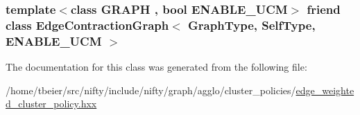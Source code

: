 \subsubsection[{Edge\+Contraction\+Graph$<$ Graph\+Type, Self\+Type, E\+N\+A\+B\+L\+E\+\_\+\+U\+C\+M $>$}]{\setlength{\rightskip}{0pt plus 5cm}template$<$class G\+R\+A\+P\+H , bool E\+N\+A\+B\+L\+E\+\_\+\+U\+C\+M$>$ friend class {\bf Edge\+Contraction\+Graph}$<$ {\bf Graph\+Type}, {\bf Self\+Type}, E\+N\+A\+B\+L\+E\+\_\+\+U\+C\+M $>$\hspace{0.3cm}{\ttfamily [friend]}}\label{classnifty_1_1graph_1_1agglo_1_1EdgeWeightedClusterPolicy_a6939aa4c6113ba9c44fd5e048687ba92}


The documentation for this class was generated from the following file\+:\begin{DoxyCompactItemize}
\item 
/home/tbeier/src/nifty/include/nifty/graph/agglo/cluster\+\_\+policies/\hyperlink{edge__weighted__cluster__policy_8hxx}{edge\+\_\+weighted\+\_\+cluster\+\_\+policy.\+hxx}\end{DoxyCompactItemize}
